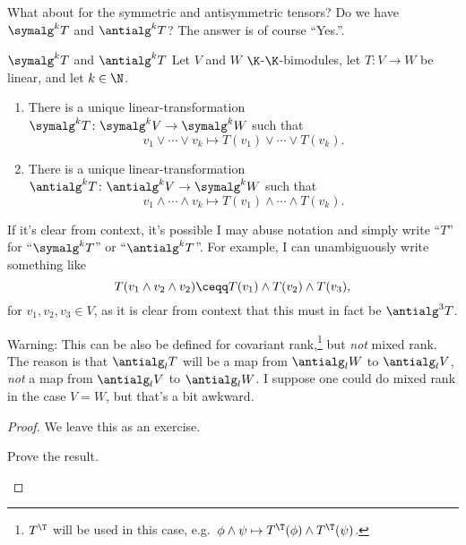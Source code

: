 What about for the symmetric and antisymmetric tensors?  Do we have $\symalg ^kT$ and $\antialg ^kT$?  The answer is of course ``Yes.''.
\begin{thm}{$\symalg ^kT$ and $\antialg ^kT$}{}
	Let $V$ and $W$  $\K$-$\K$-bimodules, let $T\colon V\rightarrow W$ be linear, and let $k\in \N$.
	\begin{enumerate}
		\item There is a unique linear-transformation $\symalg ^kT\colon \symalg ^kV\rightarrow \symalg ^kW$ such that
		\begin{equation}
			v_1\vee \cdots \vee v_k\mapsto T(v_1)\vee \cdots \vee T(v_k).
		\end{equation}
		\item There is a unique linear-transformation $\antialg ^kT\colon \antialg ^kV\rightarrow \symalg ^kW$ such that
		\begin{equation}
			v_1\wedge \cdots \wedge v_k\mapsto T(v_1)\wedge \cdots \wedge T(v_k).
		\end{equation}
	\end{enumerate}
	\begin{rmk}
		If it's clear from context, it's possible I may abuse notation and simply write ``$T$'' for ``$\symalg ^kT$'' or ``$\antialg ^kT$''.  For example, I can unambiguously write something like
		\begin{equation}
			T(v_1\wedge v_2\wedge v_2)\ceqq T(v_1)\wedge T(v_2)\wedge T(v_3),
		\end{equation}
		for $v_1,v_2,v_3\in V$, as it is clear from context that this must in fact be $\antialg ^3T$.
	\end{rmk}
	\begin{rmk}
		Warning:  This can be also be defined for covariant rank,\footnote{$T^{\T}$ will be used in this case, e.g.~$\phi \wedge \psi \mapsto T^{\T}(\phi )\wedge T^{\T}(\psi )$.} but \emph{not} mixed rank.  The reason is that $\antialg _lT$ will be a map from $\antialg _lW$ to $\antialg _lV$, \emph{not} a map from $\antialg _lV$ to $\antialg _lW$.  I suppose one could do mixed rank in the case $V=W$, but that's a bit awkward.
	\end{rmk}
	\begin{proof}
		We leave this as an exercise.
		\begin{exr}[breakable=false]{}{}
			Prove the result.
		\end{exr}
	\end{proof}
\end{thm}

